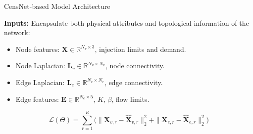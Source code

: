 \documentclass[hyperref={colorlinks,citecolor=blue,linkcolor=blue,urlcolor=blue}]{beamer}
\begin{document}
\begin{frame}{CensNet-based Model Architecture}
\scriptsize
\justifying
    \centering
    \resizebox{0.9\textwidth}{!}{%
    } 

\vspace{0.2cm}
\textbf{Inputs:} Encapsulate both physical attributes and topological information of the network:
\begin{itemize}
    \item \footnotesize Node features: 
    \(\mathbf{X} \in \mathbb{R}^{N_v \times 3}\),  
    injection limits and demand. 
    
    \item \footnotesize Node Laplacian: 
    \(\mathbf{L}_v \in \mathbb{R}^{N_v \times N_v}\),  
    node connectivity. 
    
    \item \footnotesize Edge Laplacian: 
    \(\mathbf{L}_e \in \mathbb{R}^{N_e \times N_e}\),  
    edge connectivity. 
    
    \item \footnotesize Edge features: 
    \(\mathbf{E} \in \mathbb{R}^{N_e \times 5}\),  
    \(K\), \(\beta\), flow limits. 
\end{itemize}

\[
    \mathcal{L}(\Theta) = 
    \sum_{r=1}^{R} 
    \Big(
    \| \mathbf{X}_{v,r} - \hat{\mathbf{X}}_{v,r} \|_2^2 +
    \| \mathbf{X}_{e,r} - \hat{\mathbf{X}}_{e,r} \|_2^2
    \Big)
\]
\end{frame}
\end{document}
